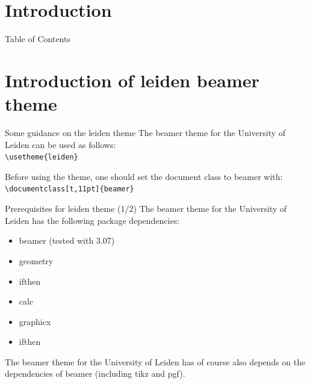 \documentclass[t,11pt]{beamer}
\subtitle{Template to generate Leiden-style slides with LaTeX}
\date{December 9th, 2010}
\title{\insertlecture}
\author{dr.~Joost Schalken}
\institute{Universiteit Leiden}
\begin{document}
\nonstopmode %


\section*{Introduction}

{
\begin{frame}[plain]
  \maketitle
\end{frame}
\addtocounter{framenumber}{-1}%
}

\begin{frame}{Table of Contents}
  \tableofcontents[sectionstyle=show/show, hideallsubsections]
\end{frame}


\section{Introduction of leiden beamer theme}

\begin{frame}[fragile]{Some guidance on the leiden theme}
The beamer theme for the University of Leiden can be used as follows:\\
\verb|\usetheme{leiden}|\\
\vspace{\baselineskip}

Before using the theme, one should set the document class to beamer
with:\\
\verb|\documentclass[t,11pt]{beamer}|
\end{frame}

\begin{frame}[fragile]{Prerequisites for leiden theme (1/2)}
The beamer theme for the University of Leiden has the following
package dependencies:
\begin{itemize}
\item	beamer (tested with 3.07)
\item	geometry
\item	ifthen
\item	calc
\item	graphicx
\item	ifthen
\end{itemize}
\vspace{\baselineskip}

The beamer theme for the University of Leiden has of course also
depends on the dependencies of beamer (including tikz and pgf).
\end{frame}
\end{document}
